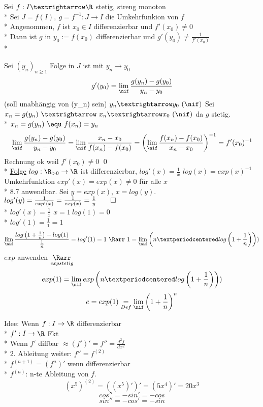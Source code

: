 Sei $f:I→\R$ stetig, streng monoton\\*
Sei $J=f(I),\ g=f^{-1}:J→I$ die Umkehrfunkion von $f$\\*
Angenommen, $f$ ist $x_0\in I$ differenzierbar und $f'(x_0)≠0$\\*
Dann ist $g$ in $y_0:=f(x_0)$ differenzierbar und $g'(y_0)≠\frac{1}{f'(x_0)}$\\*
\bew
Sei $(y_n)_{n\geq 1}$ Folge in $J$ ist mit $y_n→y_0$
$$g'(y_0)=\lim_{\nif}\frac{g(y_n)-g(y_0)}{y_n-y_0}$$
\hfill(soll unabhängig von (y_n) sein)
$y_n→y_0\ (\nif)$ Sei $x_n=g(y_n)\ →\ x_n→x_0\ (\nif)$ da $g$ stetig.\\*
$x_n=g(y_n)\ \equ\ f(x_n)=y_n$
$$\lim_{\nif}\frac{g(y_n)-g(y_0)}{y_n-y_0}=\lim_{\nif}\frac{x_n-x_0}{f(x_n)-f(x_0)}=\left(\lim_{\nif}\frac{f(x_n)-f(x_0)}{x_n-x_0}\right)^{-1}=f'(x_0)^{-1}$$
Rechnung ok weil $f'(x_0)≠0$ \qed\\*
\ul{Folge} $log: \R_{>0}\to \R$ ist differenzierbar, $log'(x) = \frac{1}{x}$
\bew
$log(x) = exp(x)^{-1}$ Umkehrfunktion $exp'(x) = exp(x) \neq 0$ für alle $x$\\*
\Rarr{} 8.7 anwendbar. Sei $y = exp(x)$, $x = log(y)$.
$log'(y) = \frac{1}{exp'(x)} = \frac{1}{exp(x)} = \frac{1}{y}\qed$\\*
$log'(x)=\frac{1}{x}$
$x=1\ log(1)=0$\\*
$log'(1)=\frac{1}{1}=1$
$$\lim_{\nif}\frac{log\left(1+\frac{1}{n}\right)-log(1)}{\frac{1}{n}}=log'(1)=1\ \Rarr\ 1=\lim_{\nif}\left(n·log\left(1+\frac{1}{n}\right)\right))$$
$exp$ anwenden $\underset{exp stetig}{\Rarr}$
$$exp(1)=\lim_{\nif}exp\left(n·log\left(1+\frac{1}{n}\right)\right))$$
$$e=exp(1)\underset{Def}{=}\lim_{\nif}\left(1+\frac{1}{n}\right)^n$$

Idee: Wenn $f: I \to \R$ differenzierbar\\*
\approx $f':I \to \R$ Fkt\\*
Wenn $f'$ diffbar $ \approx (f')' = f'' = \frac{d^2f}{dx^2}$\\*
2. Ableitung weiter:
$f'' = f^{(2)}$\\*
$f^{(n+1)} = (f^{n})'$ wenn differenzierbar\\*
$f^{(n)}$: n-te Ableitung von $f$.
\bsp
$$(x^5)^{(2)} = ((x^5)')' = (5x^4)' = 20x^3$$
$$cos'' = -sin' = -cos$$
$$sin'' = -cos' = -sin$$

